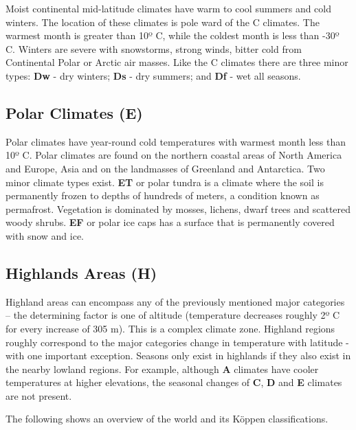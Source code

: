 Moist continental mid-latitude climates have warm to cool summers and cold winters. The location of these climates is pole ward of the C climates. The warmest month is greater than 10º C, while the coldest month is less than -30º C. Winters are severe with snowstorms, strong winds, bitter cold from Continental Polar or Arctic air masses. Like the C climates there are three minor types: \textbf{Dw} - dry winters; \textbf{Ds} - dry summers; and \textbf{Df} - wet all seasons.

\subsection{Polar Climates (E)}\label{polar-climates-e}

Polar climates have year-round cold temperatures with warmest month less than 10º C. Polar climates are found on the northern coastal areas of North America and Europe, Asia and on the landmasses of Greenland and Antarctica. Two minor climate types exist. \textbf{ET} or polar tundra is a climate where the soil is permanently frozen to depths of hundreds of meters, a condition known as permafrost. Vegetation is dominated by mosses, lichens, dwarf trees and scattered woody shrubs. \textbf{EF} or polar ice caps has a surface that is permanently covered with snow and ice.

\subsection{Highlands Areas (H)}\label{highlands-areas-h}

Highland areas can encompass any of the previously mentioned major categories -- the determining factor is one of altitude (temperature decreases roughly 2º C for every increase of 305 m). This is a complex climate zone. Highland regions roughly correspond to the major categories change in temperature with latitude - with one important exception. Seasons only exist in highlands if they also exist in the nearby lowland regions. For example, although \textbf{A} climates have cooler temperatures at higher elevations, the seasonal changes of \textbf{C}, \textbf{D} and \textbf{E} climates are not present.

The following shows an overview of the world and its Köppen classifications.

